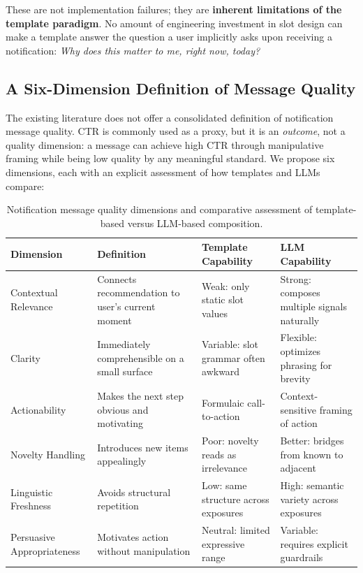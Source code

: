 \documentclass[11pt]{article}
\begin{document}
These are not implementation failures; they are \textbf{inherent limitations of the template paradigm}. No amount of engineering investment in slot design can make a template answer the question a user implicitly asks upon receiving a notification: \textit{Why does this matter to me, right now, today?}

\subsection{A Six-Dimension Definition of Message Quality}

The existing literature does not offer a consolidated definition of notification message quality. CTR is commonly used as a proxy, but it is an \textit{outcome}, not a quality dimension: a message can achieve high CTR through manipulative framing while being low quality by any meaningful standard. We propose six dimensions, each with an explicit assessment of how templates and LLMs compare:

\begin{table}[h]
\caption{Notification message quality dimensions and comparative assessment of template-based versus LLM-based composition.}
\label{tab:quality_dims}
\begin{tabular}{p{2cm}p{3.5cm}p{3.5cm}p{5cm}}
\toprule
\textbf{Dimension} & \textbf{Definition} & \textbf{Template Capability} & \textbf{LLM Capability} \\
\midrule
Contextual Relevance & Connects recommendation to user's current moment & Weak: only static slot values & Strong: composes multiple signals naturally \\
Clarity & Immediately comprehensible on a small surface & Variable: slot grammar often awkward & Flexible: optimizes phrasing for brevity \\
Actionability & Makes the next step obvious and motivating & Formulaic call-to-action & Context-sensitive framing of action \\
Novelty Handling & Introduces new items appealingly & Poor: novelty reads as irrelevance & Better: bridges from known to adjacent \\
Linguistic Freshness & Avoids structural repetition & Low: same structure across exposures & High: semantic variety across exposures \\
Persuasive Appropriateness & Motivates action without manipulation & Neutral: limited expressive range & Variable: requires explicit guardrails \\
\bottomrule
\end{tabular}
\end{table}
\end{document}
